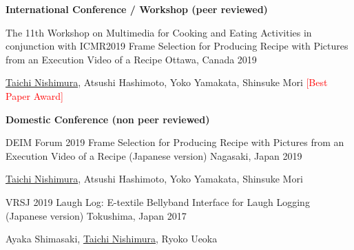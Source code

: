 \par
{\bf International Conference / Workshop (peer reviewed)}
\begin{cventries}
  \cventry
    {The 11th Workshop on Multimedia for Cooking and Eating Activities in conjunction with ICMR2019} %
    {Frame Selection for Producing Recipe with Pictures from an Execution Video of a Recipe} %
    {Ottawa, Canada} %
    {2019} %
    {
      \begin{cvitems} %
        \item {\underline{Taichi Nishimura}, Atsushi Hashimoto, Yoko Yamakata, Shinsuke Mori \textcolor{red}{[Best Paper Award]}}
      \end{cvitems}
    }
\end{cventries}
\par
{\bf Domestic Conference (non peer reviewed)}
\begin{cventries}
  \cventry
    {DEIM Forum 2019} %
    {Frame Selection for Producing Recipe with Pictures from an Execution Video of a Recipe (Japanese version)} %
    {Nagasaki, Japan} %
    {2019} %
    {
      \begin{cvitems} %
        \item {\underline{Taichi Nishimura}, Atsushi Hashimoto, Yoko Yamakata, Shinsuke Mori}
      \end{cvitems}
    }
  \cventry
    {VRSJ 2019} %
    {Laugh Log: E-textile Bellyband Interface for Laugh Logging (Japanese version)} %
    {Tokushima, Japan} %
    {2017} %
    {
      \begin{cvitems} %
        \item {Ayaka Shimasaki, \underline{Taichi Nishimura}, Ryoko Ueoka}
      \end{cvitems}
    }
\end{cventries}